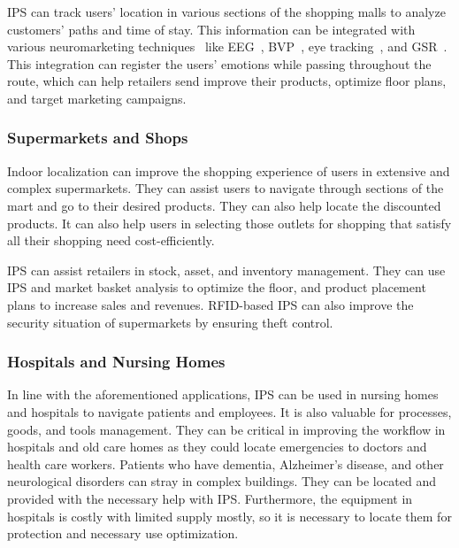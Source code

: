 \documentclass[a4paper,singleside,12pt]{report} %
\begin{document}
					IPS can track users' location in various sections of the shopping malls to analyze customers' paths and time of stay. 
					This information can be integrated with various neuromarketing techniques~\cite{fortunato2014review} like EEG~\cite{yadava2017analysis}, BVP~\cite{rosenlacher2020effect}, eye tracking~\cite{ungureanu2017neuromarketing}, and GSR~\cite{cuesta2018case}. 
					This integration can register the users' emotions while passing throughout the route, which can help retailers send improve their products, optimize floor plans, and target marketing campaigns.

				\subsubsection{Supermarkets and Shops}

					Indoor localization can improve the shopping experience of users in extensive and complex supermarkets. 
					They can assist users to navigate through sections of the mart and go to their desired products. 
					They can also help locate the discounted products. 
					It can also help users in selecting those outlets for shopping that satisfy all their shopping need cost-efficiently.
					
					IPS can assist retailers in stock, asset, and inventory management. 
					They can use IPS and market basket analysis to optimize the floor, and product placement plans to increase sales and revenues. 
					RFID-based IPS can also improve the security situation of supermarkets by ensuring theft control.

				\subsubsection{Hospitals and Nursing Homes}

					In line with the aforementioned applications, IPS can be used in nursing homes and hospitals to navigate patients and employees.
					It is also valuable for processes, goods, and tools management. 
					They can be critical in improving the workflow in hospitals and old care homes as they could locate emergencies to doctors and health care workers. 
					Patients who have dementia, Alzheimer's disease, and other neurological disorders can stray in complex buildings. 
					They can be located and provided with the necessary help with IPS. 
					Furthermore, the equipment in hospitals is costly with limited supply mostly, so it is necessary to locate them for protection and necessary use optimization. 
\end{document}
